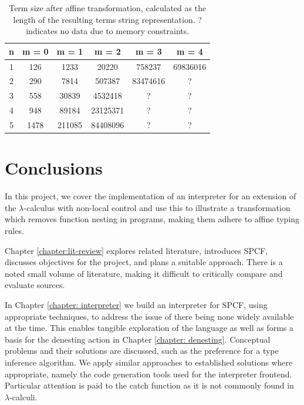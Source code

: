 \documentclass[12pt,a4paper]{report}
\theoremstyle{definition}
\theoremstyle{definition}
\theoremstyle{remark}
\begin{document}
\begin{table}[h]
  \centering
  \caption{Term size after affine transformation, calculated as the length of the resulting terms string representation. ? indicates no data due to memory constraints.}
  \label{tab:affine-term-sizes}
  \begin{tabular}{c c c c c c}
    \toprule
    \textbf{n} & \textbf{m = 0} & \textbf{m = 1} & \textbf{m = 2} & \textbf{m = 3} & \textbf{m = 4}\\
    \midrule
    1 & 126 & 1233 & 20220 & 758237 & 69836016\\
    2 & 290 & 7814 & 507387 & 83474616 & ?\\
    3 & 558 & 30839 & 4532418 & ? & ?\\
    4 & 948 & 89184 & 23125371 & ? & ?\\
    5 & 1478 & 211085 & 84408096 & ? & ?\\
    \bottomrule
  \end{tabular}
\end{table}

\chapter{Conclusions}

In this project, we cover the implementation of an interpreter for an extension of the $\lambda$-calculus with non-local control and use this to illustrate a transformation which removes function nesting in programs, making them adhere to affine typing rules. 

Chapter \ref{chapter:lit-review} explores related literature, introduces SPCF, discusses objectives for the project, and plans a suitable approach. There is a noted small volume of literature, making it difficult to critically compare and evaluate sources.  

In Chapter \ref{chapter: interpreter} we build an interpreter for SPCF, using appropriate techniques, to address the issue of there being none widely available at the time. This enables tangible exploration of the language as well as forms a basis for the denesting action in Chapter \ref{chapter: denesting}. Conceptual problems and their solutions are discussed, such as the preference for a type inference algorithm. We apply similar approaches to established solutions where appropriate, namely the code generation tools used for the interpreter frontend. Particular attention is paid to the catch function as it is not commonly found in $\lambda$-calculi.
\end{document}
